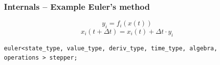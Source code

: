 \documentclass{beamer}
\newcommand{\rem}[1]{}
\begin{document}
\begin{frame}[fragile]
  \frametitle{Internals -- Example Euler's method}

  \begin{displaymath}
    y_i = f_i( x(t) )
  \end{displaymath}
  \begin{displaymath}
    x_i (t + \Delta t ) = x_i( t )  + \Delta t \cdot y_i
  \end{displaymath}

\vspace{2ex}

\begin{lstlisting}[basicstyle=\small\ttfamily]
euler<state_type, value_type, deriv_type, time_type, algebra, operations > stepper;
\end{lstlisting}

\vspace{2ex}

\begin{overlayarea}{\textwidth}{10cm}
 \rem{\only<1>{General goal: Separation 
  \begin{itemize}
   \item of how an vector is iterated
   \item of how the basic computations are performed
  \end{itemize}
from the stepper
 }}
\rem{ \only<1>{Examples:

  {\tt \scriptsize euler<vector<double>, double, vector<double>, double ,
range\_algebra, default\_operations>;}

\vspace{1ex}

  {\tt \scriptsize euler<vector<complex<double> >, double, vector<complex<double> >, double ,
range\_algebra, default\_operations>;}  

  {\tt \scriptsize euler<thurst::device\_vector<double>, double, thrust::device\_vector<double>, double ,
thrust\_algebra, thrust\_algebra>;} 
}}
\end{overlayarea}
\end{frame}
\end{document}
